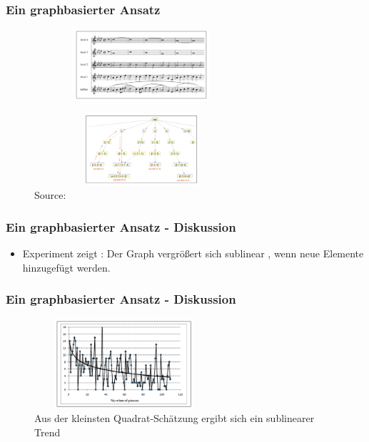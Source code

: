 \documentclass{beamer}
\begin{document}
	\begin{frame}
		\frametitle{Ein graphbasierter Ansatz}
		\begin{figure}[h!]
					\includegraphics[width=300px,height=100px,keepaspectratio]{one_of_two_point_four}
		\end{figure}
		\begin{figure}[h!]
					\includegraphics[width=300px,height=100px,keepaspectratio]{two_of_two_point_four}
					\caption{Source: \cite{two_point_four}}

		\end{figure}
	\end{frame}


	\begin{frame}
		\frametitle{Ein graphbasierter Ansatz - Diskussion}
		\begin{itemize}
				\item Experiment zeigt : Der Graph vergrößert sich sublinear , wenn neue Elemente hinzugefügt werden.
		\end{itemize}
	\end{frame}

	\begin{frame}
		\frametitle{Ein graphbasierter Ansatz - Diskussion}
		\begin{figure}[h!]
			\includegraphics[width=250px,height=125px,keepaspectratio]{three_of_two_point_four}
			\caption{Aus der kleinsten Quadrat-Schätzung ergibt sich ein sublinearer Trend \cite{two_point_four}}
		\end{figure}
	\end{frame}
\end{document}
